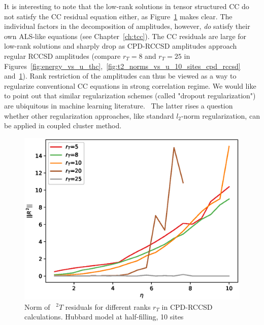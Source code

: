 It is interesting to note that the low-rank solutions in tensor structured CC 
do not satisfy the CC residual equation either, as 
Figure~\ref{fig:r2_norms_vs_u_10_sites_cpd_rccsd} makes clear. The 
individual factors in the decomposition of amplitudes, however, \emph{do} 
satisfy their own ALS-like equations (see Chapter~\ref{ch:tcc}). The CC 
residuals are large for low-rank solutions and sharply drop as 
CPD-RCCSD amplitudes approach regular RCCSD amplitudes (compare $r_{T} = 8$ 
and $r_{T} = 25$ in 
Figures~\ref{fig:energy_vs_u_thc},~\ref{fig:t2_norms_vs_u_10_sites_cpd_rccsd} 
and~\ref{fig:r2_norms_vs_u_10_sites_cpd_rccsd}). Rank restriction of the 
amplitudes can thus be viewed as a way to regularize conventional CC equations 
in strong correlation regime. We would like to point out that similar 
regularization schemes (called "dropout regularization") are ubiquitous in 
machine learning literature.~\cite{srivastava2014dropout, wan2013regularization} 
The latter rises a question whether other regularization approaches, like 
standard $l_{2}$-norm regularization, can be applied in coupled cluster method.
%
\begin{figure}[ht]
\includegraphics[width=\columnwidth]
{figures/tcc_strong_correlation/r2_norms_vs_u_10_sites_cpd_rccsd}
\caption{Norm of ~${}^2T$ residuals for different ranks $r_{T}$ in CPD-RCCSD 
calculations. Hubbard model at half-filling, 10 sites}
\label{fig:r2_norms_vs_u_10_sites_cpd_rccsd}
\end{figure}
%

